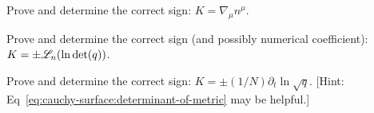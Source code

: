 \begin{exercise}
Prove and determine the correct sign: $K = \nabla_{\mu}n^{\mu}$.
\end{exercise}

\begin{exercise}
Prove and determine the correct sign (and possibly numerical
coefficient): $K = \pm\mathscr{L}_{n}(\ln\det(q))$.
\end{exercise}

\begin{exercise}
Prove and determine the correct sign: $K = \pm(1/N)\partial_{t}\ln\sqrt{q}$. [Hint: Eq~\eqref{eq:cauchy-surface:determinant-of-metric}
may be helpful.]
\end{exercise}